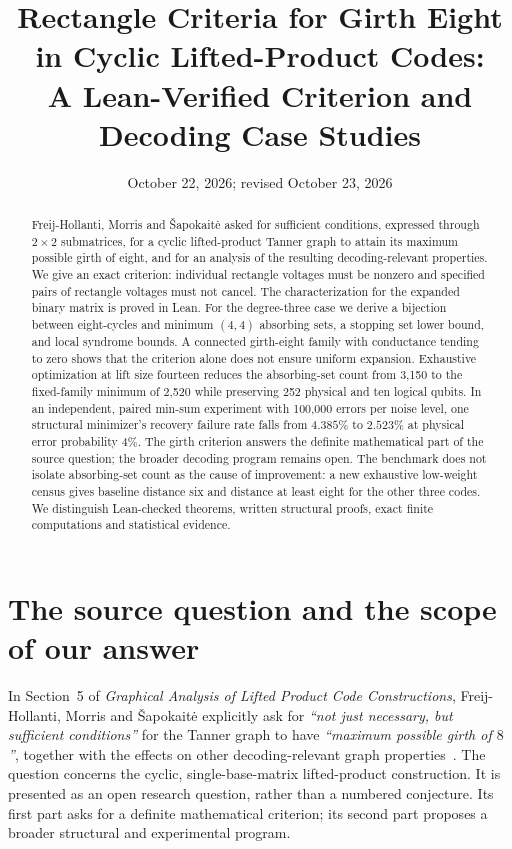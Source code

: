 \documentclass[11pt]{article}
\title{Rectangle Criteria for Girth Eight in Cyclic Lifted-Product Codes:\\
A Lean-Verified Criterion and Decoding Case Studies}
\author{}
\date{October 22, 2026; revised October 23, 2026}
\theoremstyle{definition}
\theoremstyle{remark}
\begin{document}
\maketitle
\begin{abstract}
Freij-Hollanti, Morris and \v Sapokait\.{e} asked for sufficient conditions,
expressed through $2\times2$ submatrices, for a cyclic lifted-product Tanner
graph to attain its maximum possible girth of eight, and for an analysis of
the resulting decoding-relevant properties. We give an exact criterion:
individual rectangle voltages must be nonzero and specified pairs of
rectangle voltages must not cancel. The characterization for the expanded
binary matrix is proved in Lean. For the degree-three case we derive a
bijection between eight-cycles and minimum $(4,4)$ absorbing sets, a stopping
set lower bound, and local syndrome bounds. A connected girth-eight family
with conductance tending to zero shows that the criterion alone does not
ensure uniform expansion. Exhaustive optimization at lift size fourteen
reduces the absorbing-set count from 3,150 to the fixed-family minimum of 2,520 while preserving
252 physical and ten logical qubits. In an independent, paired min-sum
experiment with 100,000 errors per noise level, one structural minimizer's recovery
failure rate falls from $4.385\%$ to $2.523\%$ at physical error probability
$4\%$. The girth criterion answers the definite mathematical part of the source
question; the broader decoding program remains open. The benchmark does not
isolate absorbing-set count as the cause of improvement: a new exhaustive
low-weight census gives baseline distance six and distance at least eight
for the other three codes. We distinguish Lean-checked theorems, written structural
proofs, exact finite computations and statistical evidence.
\end{abstract}

\section{The source question and the scope of our answer}\label{sec:question}

In Section~5 of \emph{Graphical Analysis of Lifted Product Code
Constructions}, Freij-Hollanti, Morris and \v Sapokait\.{e} explicitly ask
for \emph{``not just necessary, but sufficient conditions''} for the Tanner
graph to have \emph{``maximum possible girth of $8$''}, together with the
effects on other decoding-relevant graph properties~\cite{FHM2026}.
The question concerns the cyclic, single-base-matrix lifted-product
construction. It is presented as an open research question, rather than a
numbered conjecture. Its first part asks for a definite mathematical
criterion; its second part proposes a broader structural and experimental
program.
\end{document}
